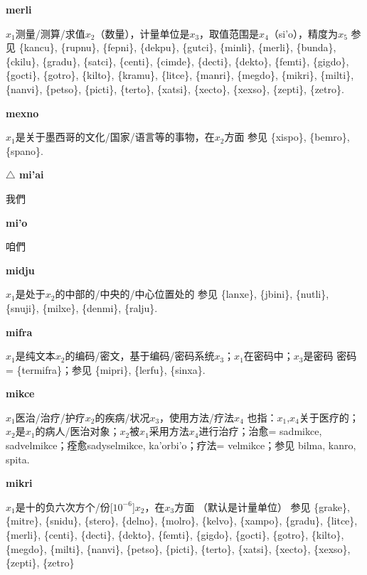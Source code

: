 \documentclass[notitlepage,twocolumn,a4paper,10pt]{book}
\begin{document}
{\sffamily\bfseries merli}\enspace {\ttfamily\bfseries[    mre]}  $x_1$测量\slash{}测算\slash{}求值$x_2$（数量），计量单位是$x_3$，取值范围是$x_4$（si'o），精度为$x_5$ \textemdash{} 参见 \{kancu\}, \{rupnu\}, \{fepni\}, \{dekpu\}, \{gutci\}, \{minli\}, \{merli\}, \{bunda\}, \{ckilu\}, \{gradu\}, \{satci\}, \{centi\}, \{cimde\}, \{decti\}, \{dekto\}, \{femti\}, \{gigdo\}, \{gocti\}, \{gotro\}, \{kilto\}, \{kramu\}, \{litce\}, \{manri\}, \{megdo\}, \{mikri\}, \{milti\}, \{nanvi\}, \{petso\}, \{picti\}, \{terto\}, \{xatsi\}, \{xecto\}, \{xexso\}, \{zepti\}, \{zetro\}.

{\sffamily\bfseries mexno}\enspace {\ttfamily\bfseries[mex]}  $x_1$是关于墨西哥的文化\slash{}国家\slash{}语言等的事物，在$x_2$方面 \textemdash{} 参见 \{xispo\}, \{bemro\}, \{spano\}.

{\sffamily\bfseries $\triangle$ mi'ai}\enspace {\sffamily\bfseries[KOhA3]}  我們

{\sffamily\bfseries mi'o}\enspace {\sffamily\bfseries[KOhA3]}  咱們

{\sffamily\bfseries midju}\enspace {\ttfamily\bfseries[mij]}  $x_1$是处于$x_2$的中部的\slash{}中央的\slash{}中心位置处的 \textemdash{} 参见 \{lanxe\}, \{jbini\}, \{nutli\}, \{snuji\}, \{milxe\}, \{denmi\}, \{ralju\}.

{\sffamily\bfseries mifra}\enspace {\ttfamily\bfseries[mif]}  $x_1$是纯文本$x_2$的编码\slash{}密文，基于编码\slash{}密码系统$x_3$；$x_1$在密码中；$x_3$是密码 \textemdash{} 密码= \{termifra\}；参见 \{mipri\}, \{lerfu\}, \{sinxa\}.

{\sffamily\bfseries mikce}\enspace {\ttfamily\bfseries[mic]}  $x_1$医治\slash{}治疗\slash{}护疗$x_2$的疾病\slash{}状况$x_3$，使用方法\slash{}疗法$x_4$ \textemdash{} 也指：$x_1$,$x_4$关于医疗的；$x_2$是$x_1$的病人\slash{}医治对象；$x_2$被$x_1$采用方法$x_4$进行治疗；治愈= {sadmikce}, {sadvelmikce}；痊愈{sadyselmikce}, {ka'orbi'o}；疗法= {velmikce}；参见 {bilma}, {kanro}, {spita}.

{\sffamily\bfseries mikri}\enspace {\ttfamily\bfseries[mik]}  $x_1$是十的负六次方个\slash{}份[$10^{-6}$]$x_2$，在$x_3$方面 （默认是计量单位） \textemdash{} 参见 \{grake\}, \{mitre\}, \{snidu\}, \{stero\}, \{delno\}, \{molro\}, \{kelvo\}, \{xampo\}, \{gradu\}, \{litce\}, \{merli\}, \{centi\}, \{decti\}, \{dekto\}, \{femti\}, \{gigdo\}, \{gocti\}, \{gotro\}, \{kilto\}, \{megdo\}, \{milti\}, \{nanvi\}, \{petso\}, \{picti\}, \{terto\}, \{xatsi\}, \{xecto\}, \{xexso\}, \{zepti\}, \{zetro\}
\end{document}
